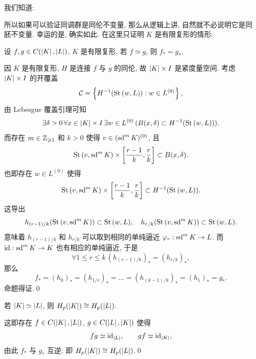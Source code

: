 我们知道:
\begin{center}
\end{center}
所以如果可以验证同调群是同伦不变量, 那么从逻辑上讲, 自然就不必说明它是同胚不变量. 幸运的是, 确实如此. 在这里只证明 $ K $ 是有限复形的情形:

\begin{Theorem}
	设 $ f,g\in C(\left| K \right| ,\left| L \right| ) $, $ K $ 是有限复形. 若 $ f\simeq g $, 则 $ f_*=g_* $.
\end{Theorem}
\begin{Proof}
	因 $ K $ 是有限复形, $ H $ 是连接 $ f $ 与 $ g $ 的同伦, 故 $ \left| K \right| \times I $ 是紧度量空间. 考虑 $ \left| K \right| \times I $ 的开覆盖
	\[
		\mathcal{C}=\left\{ H^{-1}(\mathrm{St}\,(w,L)) : w\in L^{(0)} \right\},
	\]
	由 Lebesgue 覆盖引理可知
	\[
		\exists\delta>0\,\forall x\in\left| K \right| \times I\,\exists w\in L^{(0)}\,(B(x,\delta)\subset H^{-1}(\mathrm{St}\,(w,L))).
	\]
	而存在 $ m\in\mathbb{Z}_{\geqslant 1} $ 和 $ k>0 $ 使得 $ v\in(\mathrm{sd}^m\,K)^{(0)} $, 且
	\[
		\mathrm{St}\,(v,\mathrm{sd}^m\,K)\times\left[ \frac{r-1}{k},\frac{r}{k} \right]\subset B(x,\delta).
	\]
	也即存在 $ w\in L^{(0)} $ 使得
	\[
		\mathrm{St}\,(v,\mathrm{sd}^m\,K)\times\left[ \frac{r-1}{k},\frac{r}{k} \right]\subset H^{-1}(\mathrm{St}\,(w,L)).
	\]
	这导出
	\[
		h_{(r-1)/k}(\mathrm{St}\,(v,\mathrm{sd}^m\,K))\subset\mathrm{St}\,(w,L),\quad h_{r/k}(\mathrm{St}\,(v,\mathrm{sd}^m\,K))\subset\mathrm{St}\,(w,L).
	\]
	意味着 $ h_{(r-1)/k} $ 和 $ h_{r/k} $ 可以取到相同的单纯逼近 $ \varphi_r : \mathrm{sd}^m\,K\to L $. 而 $ \mathrm{id} : \mathrm{sd}^m\,K\to K $ 也有相应的单纯逼近, 于是
	\[
		\forall 1\leqslant r\leqslant k\,(h_{(r-1)/k})_*=(h_{r/k})_*,
	\]
	那么
	\[
		f_*=(h_0)_*=(h_{1/r})_*=\dots=(h_{(k-1)/k})_*=(h_1)_*=g_*.
	\]
	命题得证.\qed
\end{Proof}

\begin{Corollary}[同调群是同伦不变量]
	若 $ \left| K \right| \simeq\left| L \right|  $, 则 $ H_p(\left| K \right| )\cong H_p(\left| L \right| ) $.
\end{Corollary}
\begin{Proof}
	这即存在 $ f\in C(\left| K \right| ,\left| L \right| ) $, $ g\in C(\left| L \right| ,\left| K \right| ) $ 使得
	\[
		fg\simeq\mathrm{id}_{\left| L \right| },\qquad gf\simeq\mathrm{id}_{\left| K \right| },
	\]
	由此 $ f_* $ 与 $ g_* $ 互逆. 即 $ H_p(\left| K \right| )\cong H_p(\left| L \right| ) $.\qed
\end{Proof}

